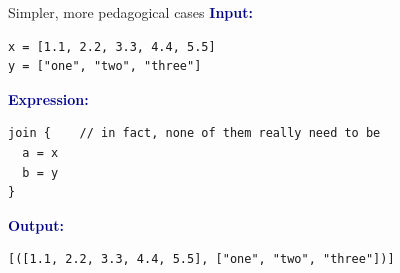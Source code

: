 \documentclass[aspectratio=169]{beamer}
\begin{document}
\begin{frame}[fragile]{Simpler, more pedagogical cases}
\vspace{0.25 cm}
\textcolor{darkblue}{\large\bf Input:}

\begin{verbatim}
x = [1.1, 2.2, 3.3, 4.4, 5.5]
y = ["one", "two", "three"]
\end{verbatim}

\vspace{0.25 cm}
\textcolor{darkblue}{\large\bf Expression:}

\begin{verbatim}
join {    // in fact, none of them really need to be
  a = x
  b = y
}
\end{verbatim}

\vspace{0.25 cm}
\textcolor{darkblue}{\large\bf Output:}

\begin{verbatim}
[([1.1, 2.2, 3.3, 4.4, 5.5], ["one", "two", "three"])]




\end{verbatim}
\end{frame}
\end{document}
